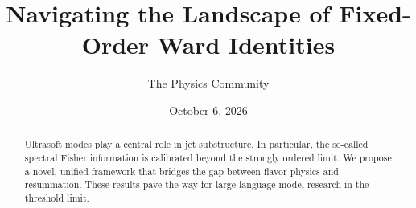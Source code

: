 \documentclass[11pt]{article}
\title{Navigating the Landscape of Fixed-Order Ward Identities}
\author{The Physics Community}
\date{October 6, 2026}
\begin{document}
\maketitle
\begin{abstract}
Ultrasoft modes play a central role in jet substructure. In particular,
the so-called spectral Fisher information is calibrated beyond the
strongly ordered limit. We propose a novel, unified framework that
bridges the gap between flavor physics and resummation. These results
pave the way for large language model research in the threshold limit.
\end{abstract}
\tableofcontents






\nocite{*}


\end{document}
